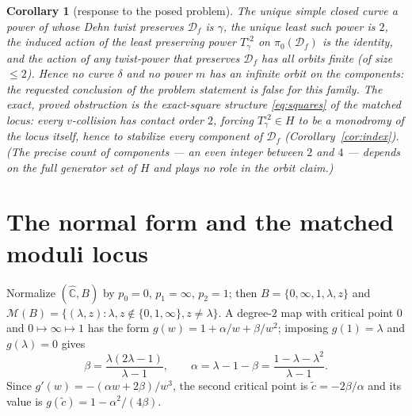\documentclass[11pt]{article}
\newtheorem{corollary}[theorem]{Corollary}
\theoremstyle{definition}
\theoremstyle{remark}
\newcommand{\MM}{\mathcal M}
\newcommand{\Chat}{\widehat{\mathbb C}}
\newcommand{\Df}{\mathcal D_f}
\begin{document}
\begin{corollary}[response to the posed problem]\label{cor:answer}
The unique simple closed curve a power of whose Dehn twist preserves
$\Df$ is $\gamma$, the unique least such power is $2$, the induced
action of the least preserving power $T_\gamma^{\circ2}$ on
$\pi_0(\Df)$ is the identity, and the action of any twist-power that
preserves $\Df$ has all orbits finite \textup{(}of size $\le2$\textup{)}.
Hence \emph{no curve $\delta$ and no power $m$ has an infinite orbit on
the components}: the requested conclusion of the problem statement is
\emph{false for this family}.  The exact, proved obstruction is the
exact-square structure \eqref{eq:squares} of the matched locus: every
$v$-collision has contact order $2$, forcing
$T_\gamma^{\circ2}\in H$ to be a monodromy of the locus itself, hence
to stabilize every component of $\Df$
\textup{(}Corollary~\ref{cor:index}\textup{)}.  \textup{(}The precise
count of components — an even integer between $2$ and $4$ — depends on
the full generator set of $H$ and plays no role in the orbit
claim.\textup{)}
\end{corollary}


\section{The normal form and the matched moduli locus}\label{sec:mf}

Normalize $(\Chat,B)$ by $p_0=0$, $p_1=\infty$, $p_2=1$; then
$B=\{0,\infty,1,\lambda,z\}$ and
$\MM(B)=\{(\lambda,z):\lambda,z\notin\{0,1,\infty\},z\neq\lambda\}$.
A degree-$2$ map with critical point $0$ and $0\mapsto\infty\mapsto1$
has the form $g(w)=1+\alpha/w+\beta/w^2$; imposing $g(1)=\lambda$ and
$g(\lambda)=0$ gives
\[
\beta=\frac{\lambda(2\lambda-1)}{\lambda-1},\qquad
\alpha=\lambda-1-\beta=\frac{1-\lambda-\lambda^2}{\lambda-1}.
\]
Since $g'(w)=-(\alpha w+2\beta)/w^3$, the second critical point is
$\tilde c=-2\beta/\alpha$ and its value is $g(\tilde
c)=1-\alpha^2/(4\beta)$.
\end{document}
